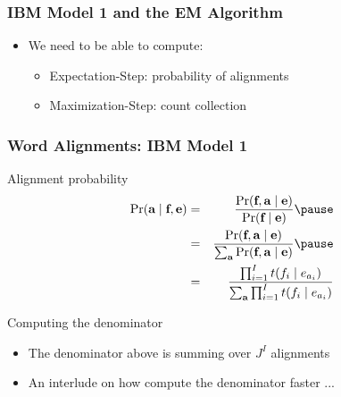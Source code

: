 \begin{frame}
\frametitle{IBM Model 1 and the EM Algorithm\koehnref}

\begin{itemize}[<+->]
\item We need to be able to compute:
\begin{itemize}
\item Expectation-Step: probability of alignments
\item Maximization-Step: count collection
\end{itemize}
\end{itemize}

\end{frame}


\begin{frame}
\frametitle{Word Alignments: IBM Model 1}
\begin{block}{Alignment probability}
\begin{eqnarray*}
\Pr(\aln \mid \src, \tgt) & = & \frac{ \Pr( \src, \aln \mid \tgt ) }{ \Pr(\src \mid \tgt) } \pause\\
& = & \frac{ \Pr( \src, \aln \mid \tgt ) }{ \sum_{\aln} \Pr(\src, \aln \mid \tgt) } \pause\\
& = & \frac{ \prod_{i=1}^I t(f_i \mid e_{a_i}) }{ \sum_{\aln} \prod_{i=1}^I t(f_i \mid e_{a_i}) }
\end{eqnarray*}
\end{block}\pause 

\begin{block}{Computing the denominator}
\begin{itemize}
\item The denominator above is summing over $J^I$ alignments
\item An interlude on how compute the denominator faster ...
\end{itemize}

\end{block}

\end{frame}

%
%
%


